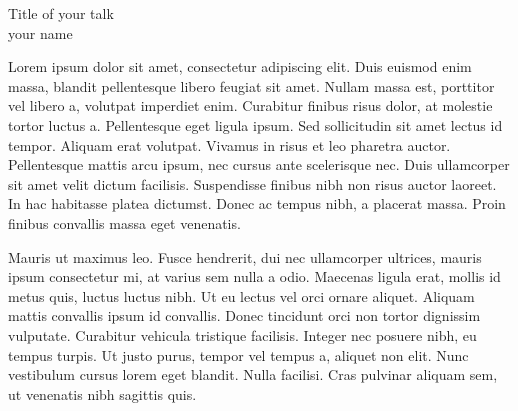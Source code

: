 \documentclass[class=article, crop=false]{standalone}
\begin{document}
\begin{center}
	\huge Title of your talk\\ %
	\Large your name \\ %
	\normalsize
\end{center}
Lorem ipsum dolor sit amet, consectetur adipiscing elit. Duis euismod enim massa, blandit pellentesque libero feugiat sit amet. Nullam massa est, porttitor vel libero a, volutpat imperdiet enim. Curabitur finibus risus dolor, at molestie tortor luctus a. Pellentesque eget ligula ipsum. Sed sollicitudin sit amet lectus id tempor. Aliquam erat volutpat. Vivamus in risus et leo pharetra auctor. Pellentesque mattis arcu ipsum, nec cursus ante scelerisque nec. Duis ullamcorper sit amet velit dictum facilisis. Suspendisse finibus nibh non risus auctor laoreet. In hac habitasse platea dictumst. Donec ac tempus nibh, a placerat massa. Proin finibus convallis massa eget venenatis.

Mauris ut maximus leo. Fusce hendrerit, dui nec ullamcorper ultrices, mauris ipsum consectetur mi, at varius sem nulla a odio. Maecenas ligula erat, mollis id metus quis, luctus luctus nibh. Ut eu lectus vel orci ornare aliquet. Aliquam mattis convallis ipsum id convallis. Donec tincidunt orci non tortor dignissim vulputate. Curabitur vehicula tristique facilisis. Integer nec posuere nibh, eu tempus turpis. Ut justo purus, tempor vel tempus a, aliquet non elit. Nunc vestibulum cursus lorem eget blandit. Nulla facilisi. Cras pulvinar aliquam sem, ut venenatis nibh sagittis quis.
\end{document}
